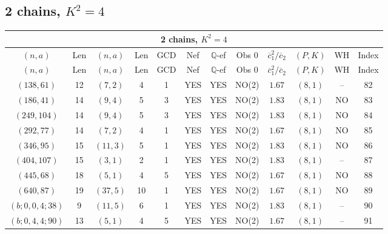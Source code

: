 \subsection{2 chains, $K^2 = 4$}
\begin{longtable}{|c|c|c|c|c|c|c|c|c|c|c|c|}
\hline
\multicolumn{12}{|c|}{2 chains, $K^2 = 4$}\\
\hline
$(n,a)$ & Len & $(n,a)$ & Len & GCD & Nef & $\mathbb Q$-ef & Obs 0 & $\overline c_1^2 / \overline c_2$ & $(P,K)$ & WH & Index\\
\hline
\endfirsthead

\hline
$(n,a)$ & Len & $(n,a)$ & Len & GCD & Nef & $\mathbb Q$-ef & Obs 0 & $\overline c_1^2 / \overline c_2$ & $(P,K)$ & WH & Index\\
\hline
\endhead
\hline
\endfoot

$(138,61)$ & 12 & $(7,2)$ & 4 & 1 & YES & YES & NO(2) & $1.67$ & $(8,1)$ & -- & 82\\
$(186,41)$ & 14 & $(9,4)$ & 5 & 3 & YES & YES & NO(2) & $1.83$ & $(8,1)$ & NO & 83\\
$(249,104)$ & 14 & $(9,4)$ & 5 & 3 & YES & YES & NO(2) & $1.83$ & $(8,1)$ & NO & 84\\
$(292,77)$ & 14 & $(7,2)$ & 4 & 1 & YES & YES & NO(2) & $1.67$ & $(8,1)$ & NO & 85\\
$(346,95)$ & 15 & $(11,3)$ & 5 & 1 & YES & YES & NO(2) & $1.83$ & $(8,1)$ & NO & 86\\
$(404,107)$ & 15 & $(3,1)$ & 2 & 1 & YES & YES & NO(2) & $1.83$ & $(8,1)$ & -- & 87\\
$(445,68)$ & 18 & $(5,1)$ & 4 & 5 & YES & YES & NO(2) & $1.67$ & $(8,1)$ & NO & 88\\
$(640,87)$ & 19 & $(37,5)$ & 10 & 1 & YES & YES & NO(2) & $1.67$ & $(8,1)$ & NO & 89\\
$(b;0,0,4;38)$ & 9 & $(11,5)$ & 6 & 1 & YES & YES & NO(2) & $1.83$ & $(8,1)$ & -- & 90\\
$(b;0,4,4;90)$ & 13 & $(5,1)$ & 4 & 5 & YES & YES & NO(2) & $1.67$ & $(8,1)$ & -- & 91
\end{longtable}
